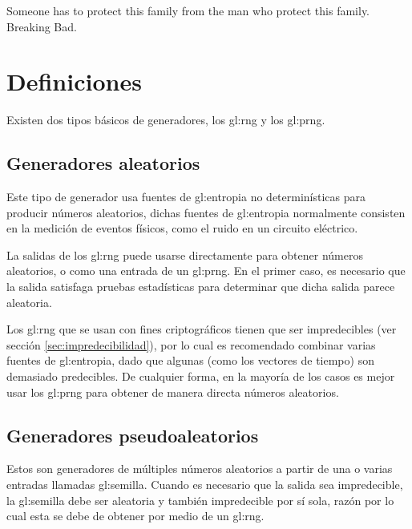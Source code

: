 %
%
%

{
  \epigrafe
  {%
    Someone has to protect this family from the man who protect this family.%
  }
  {%
    Breaking Bad.%
  }
}


\section{Definiciones} %

Existen dos tipos básicos de generadores, los \gls{gl:rng} y los \gls{gl:prng}.

\subsection{Generadores aleatorios} %

Este tipo de generador usa fuentes de \gls{gl:entropia} no determinísticas
para producir números aleatorios, dichas fuentes de \gls{gl:entropia}
normalmente consisten en la medición de eventos físicos, como el ruido
en un circuito eléctrico.

La salidas de los \gls{gl:rng} puede usarse directamente para obtener números
aleatorios, o como una entrada de un \gls{gl:prng}. En el primer caso, es
necesario que la salida satisfaga pruebas estadísticas para determinar que
dicha salida parece aleatoria.

Los \gls{gl:rng} que se usan con fines criptográficos tienen que ser
impredecibles (ver sección \ref{sec:impredecibilidad}), por lo cual es
recomendado combinar varias fuentes de \gls{gl:entropia}, dado que algunas
(como los vectores de tiempo) son demasiado predecibles. De cualquier forma,
en la mayoría de los casos es mejor usar los \gls{gl:prng} para obtener de
manera directa números aleatorios.

\subsection{Generadores pseudoaleatorios} %

Estos son generadores de múltiples números aleatorios a partir de una o varias
entradas llamadas \gls{gl:semilla}. Cuando es necesario que la salida sea
impredecible, la \gls{gl:semilla} debe ser aleatoria y también impredecible
por sí sola, razón por lo cual esta se debe de obtener por medio de un
\gls{gl:rng}.

